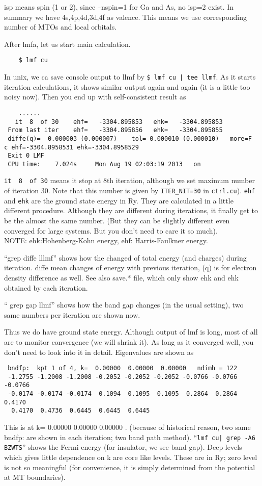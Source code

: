 \documentclass[a4paper,10pt,epsf,fleqn]{article}
\begin{document}
isp means spin (1 or 2), since --nspin=1 for Ga and As, no isp=2 exist.
In summary we have 4s,4p,4d,3d,4f as valence. 
This means we use corresponding number of MTOs and local orbitals.

After lmfa, let us start main calculation.
\begin{verbatim}
    $ lmf cu
\end{verbatim}

In unix, we ca save console output to llmf by
\verb+$ lmf cu | tee llmf+.
As it starts iteration calculations, 
it shows similar output again and again (it is a little too noisy now).
Then you end up with self-consistent result as
\begin{verbatim}
    ......
   it  8  of 30    ehf=   -3304.895853   ehk=   -3304.895853
 From last iter    ehf=   -3304.895856   ehk=   -3304.895855
 diffe(q)=  0.000003 (0.000007)    tol= 0.000010 (0.000010)   more=F
c ehf=-3304.8958531 ehk=-3304.8958529
 Exit 0 LMF 
 CPU time:    7.024s     Mon Aug 19 02:03:19 2013   on  
\end{verbatim}
\verb+it  8  of 30+ means it stop at 8th iteration, although we set
maximum number of iteration 30. Note that this number is 
given by \verb+ITER_NIT=30+ in \verb+ctrl.cu+).
\verb+ehf+ and \verb+ehk+ are the ground state energy in Ry.
They are calculated in a little different procedure. Although
they are different during iterations, it finally get to be the
almost the same number. (But they can be slightly different 
even converged for large systems. But you don't need to care it so much).\\
NOTE: ehk:Hohenberg-Kohn energy, ehf: Harris-Faulkner energy.

``grep diffe lllmf'' shows how the changed of total energy (and charges)
during iteration. diffe mean  changes of energy with previous
iteration, (q) is for electron density difference as well.
See also save.* file, which only show ehk and ehk obtained by each
iteration.

`` grep gap llmf'' shows how the band gap changes
(in the usual setting), two same numbers per iteration are shown now.

Thus we do have ground state energy.
Although output of lmf is long, most of all are to monitor
convergence (we will shrink it).
As long as it converged well, you don't need to look into it in detail.
Eigenvalues are shown as
\begin{verbatim}
 bndfp:  kpt 1 of 4, k=  0.00000  0.00000  0.00000   ndimh = 122
 -1.2755 -1.2008 -1.2008 -0.2052 -0.2052 -0.2052 -0.0766 -0.0766 -0.0766
 -0.0174 -0.0174 -0.0174  0.1094  0.1095  0.1095  0.2864  0.2864  0.4170
  0.4170  0.4736  0.6445  0.6445  0.6445
\end{verbatim}
This is at k=  0.00000  0.00000  0.00000 .
(because of historical reason, two same bndfp: are shown in each
iteration; two band path method).  ``\verb+lmf cu| grep -A6 BZWTS+'' shows the Fermi energy
(for insulator, we see band gap). 
Deep levels which gives little dependence on k are core like levels.
These are in Ry; zero level is not so meaningful (for convenience, it is
simply determined from the potential at MT boundaries).
\end{document}
